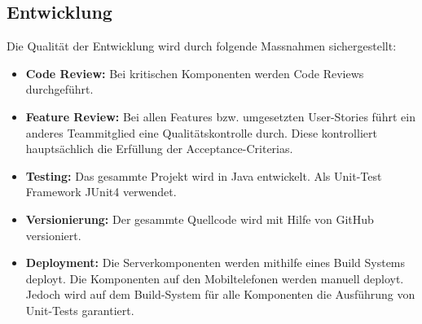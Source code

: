 \subsection{Entwicklung}
Die Qualität der Entwicklung wird durch folgende Massnahmen sichergestellt:
\begin{itemize}
	\item{\textbf{Code Review:} Bei kritischen Komponenten werden Code Reviews durchgeführt.}
	
	\item{\textbf{Feature Review:} Bei allen Features bzw. umgesetzten User-Stories führt ein anderes Teammitglied eine Qualitätskontrolle durch. Diese kontrolliert hauptsächlich die Erfüllung der Acceptance-Criterias.}
	
	\item{\textbf{Testing:} Das gesammte Projekt wird in Java entwickelt. Als Unit-Test Framework JUnit4 verwendet.}
	
	\item{\textbf{Versionierung:} Der gesammte Quellcode wird mit Hilfe von GitHub versioniert.}
	
	\item{\textbf{Deployment:} Die Serverkomponenten werden mithilfe eines Build Systems deployt. Die Komponenten auf den Mobiltelefonen werden manuell deployt. Jedoch wird auf dem Build-System für alle Komponenten die Ausführung von Unit-Tests garantiert.}
	
\end{itemize}

\newpage
